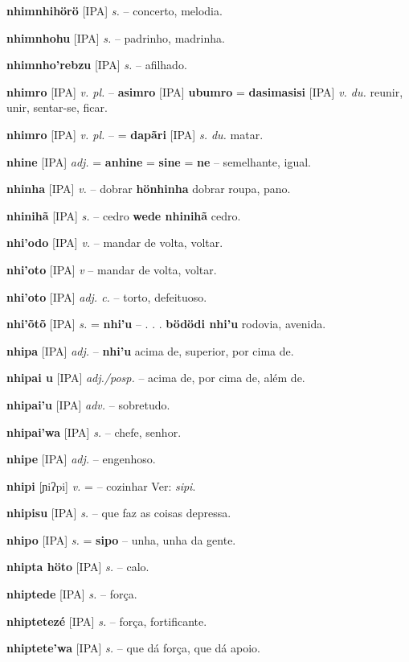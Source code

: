 \textbf{nhimnhihörö} [IPA] \textit{s.} -- concerto, melodia.

\textbf{nhimnhohu} [IPA] \textit{s.} -- padrinho, madrinha.

\textbf{nhimnho'rebzu} [IPA] \textit{s.} -- afilhado.

\textbf{nhimro} [IPA] \textit{v. pl.} -- \textbf{asimro} [IPA] \textbf{ubumro} = \textbf{dasimasisi} [IPA] \textit{v. du.} reunir, unir, sentar-se, ficar.

\textbf{nhimro} [IPA] \textit{v. pl.} -- = \textbf{dapãri} [IPA] \textit{s. du.} matar.

\textbf{nhine} [IPA] \textit{adj.} = \textbf{anhine} = \textbf{sine} = \textbf{ne} -- semelhante, igual.

\textbf{nhinha} [IPA] \textit{v.} -- dobrar  \textbf{hönhinha} dobrar roupa, pano.

\textbf{nhinihã} [IPA] \textit{s.} -- cedro  \textbf{wede nhinihã} cedro.

\textbf{nhi'odo} [IPA] \textit{v.} -- mandar de volta, voltar.

\textbf{nhi'oto} [IPA] \textit{v} -- mandar de volta, voltar.

\textbf{nhi'oto} [IPA] \textit{adj. c.} -- torto, defeituoso.

\textbf{nhi'õtõ} [IPA] \textit{s.} = \textbf{nhi'u} -- . . .  \textbf{bödödi nhi'u} rodovia, avenida.

\textbf{nhipa} [IPA] \textit{adj.} -- \textbf{nhi'u} acima de, superior, por cima de.

\textbf{nhipai u} [IPA] \textit{adj./posp.} -- acima de, por cima de, além de.

\textbf{nhipai'u} [IPA] \textit{adv.} -- sobretudo.

\textbf{nhipai'wa} [IPA] \textit{s.} -- chefe, senhor.

\textbf{nhipe} [IPA] \textit{adj.} -- engenhoso.

\textbf{nhipi} [ɲiʔpi] \textit{v.} = -- cozinhar Ver: \textit{sipi}.

\textbf{nhipisu} [IPA] \textit{s.} -- que faz as coisas depressa.

\textbf{nhipo} [IPA] \textit{s.} = \textbf{sipo} -- unha, unha da gente.

\textbf{nhipta höto} [IPA] \textit{s.} -- calo.

\textbf{nhiptede} [IPA] \textit{s.} -- força.

\textbf{nhiptetezé} [IPA] \textit{s.} -- força, fortificante.

\textbf{nhiptete'wa} [IPA] \textit{s.} -- que dá força, que dá apoio.

